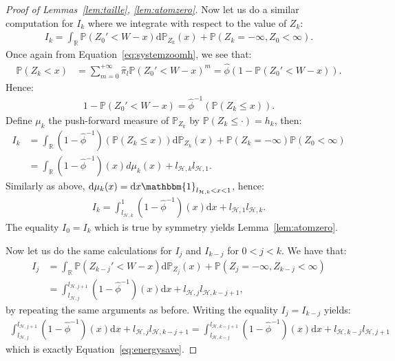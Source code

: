 \documentclass[11pt]{article}
\begin{document}
\begin{proof}[Proof of Lemmas~\ref{lem:taille}, \ref{lem:atomzero}]
    Now let us do a similar computation for $I_k$ where we integrate with respect to the value of $Z_k$:
    \begin{align*}
        I_k=\int_{\mathbb{R}}\mathbb{P}(Z_0'<W-x)\mathrm{d}\mathbb{P}_{Z_k}(x) + \mathbb{P}(Z_k=-\infty, Z_0< \infty) .
    \end{align*}
    Once again from Equation~\eqref{eq:systemzoomh}, we see that:
    \begin{align*}
        \mathbb{P}(Z_k<x)&= \sum_{m=0}^{+\infty}\hat{\pi}_l\mathbb{P}(Z_0'<W-x)^m =\hat{\phi}(1-\mathbb{P}(Z_0'<W-x)).
    \end{align*}
    Hence:
    \begin{align*}
    1-\mathbb{P}(Z_0'<W-x)=\hat{\phi}^{-1}(\mathbb{P}(Z_k \leq x)).
    \end{align*}
    Define $\mu_k$ the push-forward measure of $\mathbb{P}_{Z_k}$ by $\mathbb{P}(Z_k\leq \cdot)= h_k$, then:
    \begin{align*}
        I_k&=\int_{\mathbb{R}}(1-\hat{\phi}^{-1})(\mathbb{P}(Z_k\leq x))\mathrm{d}\mathbb{P}_{Z_k}(x) + \mathbb{P}(Z_k=-\infty)\mathbb{P}(Z_0<\infty) \\
        &=\int_{\mathbb{R}}(1-\hat{\phi}^{-1})(x)d\mu_k(x) + l_{\mathcal{H},k}l_{\mathcal{H},1}.
    \end{align*}
    Similarly as above, $\mathrm{d}\mu_k(x)=\mathrm{d}x \mathbbm{1}_{l_{\mathcal{H},k}<x<1}$, hence:
    \begin{align*}
        I_k=\int_{l_{\mathcal{H},k}}^{1}(1-\hat{\phi}^{-1})(x)\mathrm{d}x + l_{\mathcal{H},1}l_{\mathcal{H},k}.
    \end{align*}
    The equality $I_0=I_k$ which is true by symmetry yields Lemma~\ref{lem:atomzero}.

\bigskip
    
    Now let us do the same calculations for $I_j$ and $I_{k-j}$ for $0<j<k$.
    We have that:
    \begin{align*}
        I_j&=\int_{\mathbb{R}}\mathbb{P}(Z_{k-j}'<W-x)\mathrm{d}\mathbb{P}_{Z_j}(x)+\mathbb{P}(Z_j=-\infty,Z_{k-j}<\infty) \\
        &=\int_{l_{\mathcal{H},j}}^{l_{\mathcal{H},j+1}}(1-\hat{\phi}^{-1})(x)\mathrm{d}x + l_{\mathcal{H},j}l_{\mathcal{H},k-j+1},
    \end{align*}
    by repeating the same arguments as before. Writing the equality $I_j=I_{k-j}$ yields:
    \begin{align*}
        \int_{l_{\mathcal{H},j}}^{l_{\mathcal{H},j+1}}(1-\hat{\phi}^{-1})(x)\mathrm{d}x + l_{\mathcal{H},j}l_{\mathcal{H},k-j+1}=\int_{l_{\mathcal{H},k-j}}^{l_{\mathcal{H},k-j+1}}(1-\hat{\phi}^{-1})(x)\mathrm{d}x + l_{\mathcal{H},k-j}l_{\mathcal{H},j+1}
    \end{align*}
    which is exactly Equation~\eqref{eq:energysave}.


\end{proof}
\end{document}
